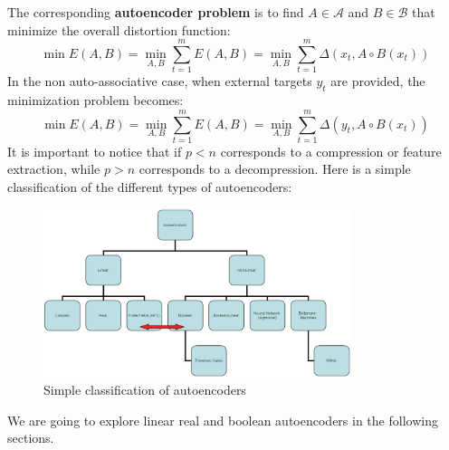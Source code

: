 \documentclass{article}
\begin{document}
 The corresponding \textbf{autoencoder problem} is to find $A \in \mathcal{A}$ and $B \in \mathcal{B}$ that minimize the overall distortion function:
\begin{equation}
    \min E(A,B) = \min_{A ,B} \sum_{t=1}^m E(A,B)=\min_{A ,B} \sum_{t=1}^m \Delta(x_t, A \circ B(x_t))
\end{equation}
In the non auto-associative case, when external targets $y_t$ are provided, the minimization
problem becomes:
\begin{equation}
    \min E(A,B) = \min_{A ,B} \sum_{t=1}^m E(A,B)=\min_{A ,B} \sum_{t=1}^m \Delta(y_t, A \circ B(x_t))
\end{equation}
It is important to notice that if $p < n$ corresponds to a compression or feature extraction, while $p > n$ corresponds to a decompression. Here is a simple classification of the different types of autoencoders:
\begin{figure}[H]
  \centering
  \includegraphics[width=0.8\textwidth]{./Images/Autoencoders_Classification.png}
  \caption{Simple classification of autoencoders}
\end{figure}
We are going to explore linear real and boolean autoencoders in the following sections.









\newpage
{}
\nocite{*}

\end{document}
